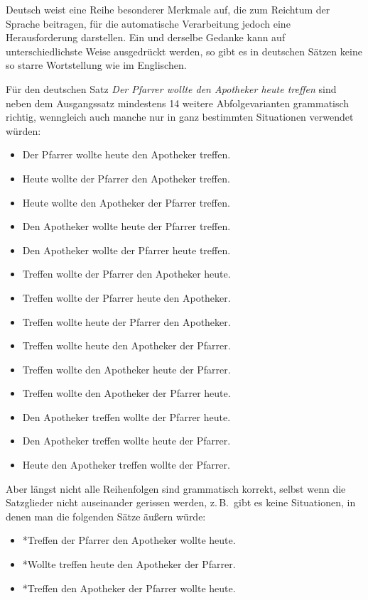 \begin{multicols}{2}
Deutsch weist eine Reihe besonderer Merkmale auf, die zum Reichtum der Sprache beitragen, für die automatische Verarbeitung jedoch eine Herausforderung darstellen. Ein und derselbe Gedanke kann auf unterschiedlichste Weise ausgedrückt werden, so gibt es in deutschen Sätzen keine so starre Wortstellung wie im Englischen.

Für den deutschen Satz \textit{Der Pfarrer wollte den Apotheker heute treffen}
sind neben dem Ausgangssatz mindestens 14 weitere Abfolgevarianten grammatisch richtig, wenngleich auch manche nur in ganz bestimmten Situationen verwendet würden: 

\begin{itemize}
\item Der Pfarrer wollte heute den Apotheker treffen.
\item Heute wollte der Pfarrer den Apotheker treffen.
\item Heute wollte den Apotheker der Pfarrer treffen.
\item Den Apotheker wollte heute der Pfarrer treffen.
\item Den Apotheker wollte der Pfarrer heute treffen.
\item Treffen wollte der Pfarrer den Apotheker heute.
\item Treffen wollte der Pfarrer heute den Apotheker.
\item Treffen wollte heute der Pfarrer den Apotheker.
\item Treffen wollte heute den Apotheker der Pfarrer.
\item Treffen wollte den Apotheker heute der Pfarrer.
\item Treffen wollte den Apotheker der Pfarrer heute.
\item Den Apotheker treffen wollte der Pfarrer heute.
\item Den Apotheker treffen wollte heute der Pfarrer.
\item Heute den Apotheker treffen wollte der Pfarrer.
\end{itemize}

Aber längst nicht alle Reihenfolgen sind grammatisch korrekt, selbst 
wenn die Satzglieder nicht auseinander gerissen werden, z.\,B.~gibt es
keine Situationen, in denen man die folgenden Sätze äußern würde:

\begin{itemize}
\item *Treffen der Pfarrer den Apotheker wollte heute.
\item *Wollte treffen heute den Apotheker der Pfarrer. 
\item *Treffen den Apotheker der Pfarrer wollte heute.
\end{itemize} 


\end{multicols}
